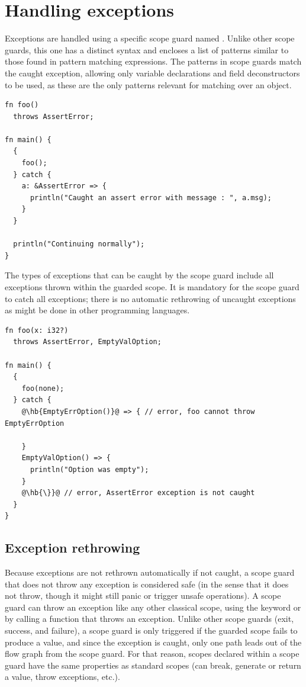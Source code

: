 \section{Handling exceptions}
\label{sec:flow:catching_errors}

Exceptions are handled using a specific scope guard named . Unlike
other scope guards, this one has a distinct syntax and encloses a list of
patterns similar to those found in pattern matching expressions. The patterns in
 scope guards match the caught exception, allowing only
variable declarations and field deconstructors to be used, as these are the only
patterns relevant for matching over an object.


\begin{lstlisting}[style=coloredverbatim]
fn foo()
  throws AssertError;

fn main() {
  {
    foo();
  } catch {
    a: &AssertError => {
      println("Caught an assert error with message : ", a.msg);
    }
  }

  println("Continuing normally");
}
\end{lstlisting}

The types of exceptions that can be caught by the  scope guard
include all exceptions thrown within the guarded scope. It is mandatory for the
scope guard to catch all exceptions; there is no automatic rethrowing of
uncaught exceptions as might be done in other programming languages.

\begin{lstlisting}[style=coloredverbatimError, escapechar=@]
fn foo(x: i32?)
  throws AssertError, EmptyValOption;

fn main() {
  {
    foo(none);
  } catch {
    @\hb{EmptyErrOption()}@ => { // error, foo cannot throw EmptyErrOption

    }
    EmptyValOption() => {
      println("Option was empty");
    }
    @\hb{\}}@ // error, AssertError exception is not caught
  }
}
\end{lstlisting}

\subsection{Exception rethrowing}

Because exceptions are not rethrown automatically if not caught, a 
scope guard that does not throw any exception is considered safe (in the sense
that it does not throw, though it might still panic or trigger unsafe
operations). A  scope guard can throw an exception like any other
classical scope, using the keyword  or by calling a function that
throws an exception. Unlike other scope guards (exit, success, and failure), a
 scope guard is only triggered if the guarded scope fails to
produce a value, and since the exception is caught, only one path leads out of
the flow graph from the scope guard. For that reason, scopes declared within a
 scope guard have the same properties as standard scopes (can
break, generate or return a value, throw exceptions, etc.).



